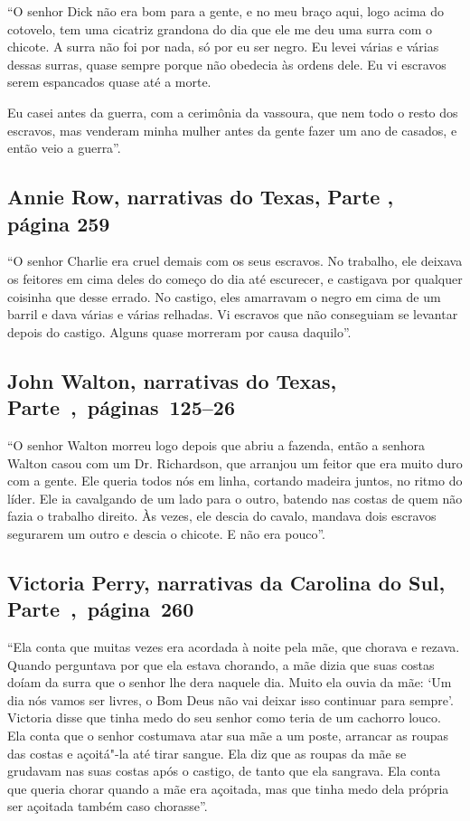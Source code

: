 ``O senhor Dick não era bom para a gente, e no meu braço aqui, logo
acima do cotovelo, tem uma cicatriz grandona do dia que ele me deu uma
surra com o chicote. A surra não foi por nada, só por eu ser negro. Eu
levei várias e várias dessas surras, quase sempre porque não obedecia às
ordens dele. Eu vi escravos serem espancados quase até a morte.

Eu casei antes da guerra, com a cerimônia da vassoura, que nem todo o
resto dos escravos, mas venderam minha mulher antes da gente fazer um
ano de casados, e então veio a guerra''.

\subsection{Annie Row, narrativas do Texas, Parte , página 259}
\label{ref230}

``O senhor Charlie era cruel demais com os seus escravos. No trabalho,
ele deixava os feitores em cima deles do começo do dia até escurecer, e
castigava por qualquer coisinha que desse errado. No castigo, eles
amarravam o negro em cima de um barril e dava várias e várias relhadas.
Vi escravos que não conseguiam se levantar depois do castigo. Alguns
quase morreram por causa daquilo''.

\subsection{John Walton, narrativas do Texas, Parte~,~páginas~125--26}
\label{ref274}

``O senhor Walton morreu logo depois que abriu a fazenda, então a
senhora Walton casou com um Dr. Richardson, que arranjou um feitor que
era muito duro com a gente. Ele queria todos nós em linha, cortando
madeira juntos, no ritmo do líder. Ele ia cavalgando de um lado para o
outro, batendo nas costas de quem não fazia o trabalho direito. Às
vezes, ele descia do cavalo, mandava dois escravos segurarem um outro e
descia o chicote. E não era pouco''.

\subsection{Victoria Perry, narrativas da Carolina do Sul, Parte~,~página~260}
\label{ref210}

``Ela conta que muitas vezes era acordada à noite pela mãe, que chorava
e rezava. Quando perguntava por que ela estava chorando, a mãe dizia que
suas costas doíam da surra que o senhor lhe dera naquele dia. Muito ela
ouvia da mãe: `Um dia nós vamos ser livres, o Bom Deus não vai deixar
isso continuar para sempre'. Victoria disse que tinha medo do seu senhor
como teria de um cachorro louco. Ela conta que o senhor costumava atar
sua mãe a um poste, arrancar as roupas das costas e açoitá"-la até tirar
sangue. Ela diz que as roupas da mãe se grudavam nas suas costas após o
castigo, de tanto que ela sangrava. Ela conta que queria chorar quando a
mãe era açoitada, mas que tinha medo dela própria ser açoitada também
caso chorasse''.


